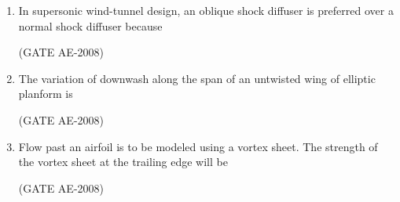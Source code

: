 \documentclass[journal,12pt,onecolumn]{IEEEtran}
\theoremstyle{remark}
\begin{document}
\begin{enumerate}
    \quad

\item In supersonic wind-tunnel design, an oblique shock diffuser is preferred over a normal shock diffuser because 
\begin{enumerate}
\end{enumerate}
 \hfill(GATE AE-2008)

    \quad

\item The variation of downwash along the span of an untwisted wing of elliptic planform is  
\begin{enumerate}
\end{enumerate}
 \hfill(GATE AE-2008)

    \quad

\item Flow past an airfoil is to be modeled using a vortex sheet. The strength of the vortex sheet at the trailing edge will be  
\begin{enumerate}
\end{enumerate}
 \hfill(GATE AE-2008)

    \quad


\end{enumerate}
\end{document}
